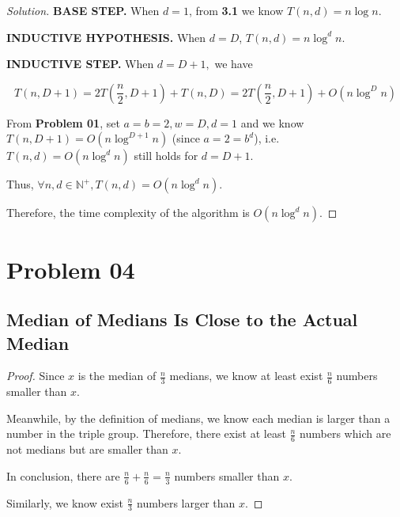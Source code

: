 \documentclass{article}
\newenvironment{solution}{\begin{proof}[\noindent\it Solution]}{\end{proof}}
\begin{document}
\begin{solution}
    \hspace{1.3em}
    \textbf{BASE STEP.} When $d=1$, from \textbf{3.1} we know $T(n,d)=n\log n$.
    
    \hspace{1.3em}
    \textbf{INDUCTIVE HYPOTHESIS.} When $d=D$, $T(n,d)=n\log^dn.$
    
    \hspace{1.3em}
    \textbf{INDUCTIVE STEP.} When $d=D+1,$ we have
    
    \vspace{-1em}
    $$T(n,D+1)=2T\left(\frac{n}{2},D+1\right)+T\left(n,D\right)=2T\left(\frac{n}{2},D+1\right)+O(n\log^Dn)$$
    
    \hspace{1.3em}
    From \textbf{Problem 01}, set $a=b=2, w=D, d=1$ and we know $T(n,D+1)=O(n\log^{D+1}n)$ (since $a=2=b^d$), i.e. $T(n,d)=O(n\log^dn)$ still holds for $d=D+1.$
    
    \hspace{1.3em}
    Thus, $\forall n,d\in\mathbb{N}^+, T(n,d)=O(n\log^dn).$
    
    \vspace{1em}
    \hspace{1.3em}
    Therefore, the time complexity of the algorithm is $O(n\log^dn).$
\end{solution}




\section{Problem 04}
\subsection{Median of Medians Is Close to the Actual Median}
\vspace{.5em}
\begin{proof}
    Since $x$ is the median of $\frac{n}{3}$ medians, we know at least exist $\frac{n}{6}$ numbers smaller than $x$.
    
    \hspace{1.3em}
    Meanwhile, by the definition of medians, we know each median is larger than a number in the triple group. Therefore, there exist at least $\frac{n}{6}$ numbers which are not medians but are smaller than $x$. 
    
    \hspace{1.3em}
    In conclusion, there are $\frac{n}{6}+\frac{n}{6}=\frac{n}{3}$ numbers smaller than $x$.
    
    \hspace{1.3em}
    Similarly, we know exist $\frac{n}{3}$ numbers larger than $x$.
\end{proof}
\end{document}
